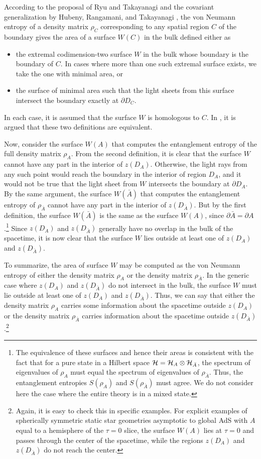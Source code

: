 \documentclass[12pt]{article}
\renewcommand{\(}{\left(}
\renewcommand{\)}{\right)}
\begin{document}
According to the proposal of Ryu and Takayanagi \cite{Ryu:2006bv} and the covariant generalization by Hubeny, Rangamani, and Takayanagi \cite{Hubeny:2007xt}, the von Neumann entropy of a density matrix $\rho_C$ corresponding to any spatial region $C$ of the boundary gives the area of a surface $W(C)$ in the bulk defined either as
\begin{itemize}
\item
the extremal codimension-two surface $W$ in the bulk whose boundary is the boundary of $C$. In cases where more than one such extremal surface exists, we take the one with minimal area, or
\item
the surface of minimal area such that the light sheets from this surface intersect the boundary exactly at $\partial D_C.$
\end{itemize}
In each case, it is assumed that the surface $W$ is homologous to $C$. In \cite{Hubeny:2007xt}, it is argued that these two definitions are equivalent.

Now, consider the surface $W(A)$ that computes the entanglement entropy of the full density matrix $\rho_A$. From the second definition, it is clear that the surface $W$ cannot have any part in the interior of $z(D_A)$. Otherwise, the light rays from any such point would reach the boundary in the interior of region $D_A$, and it would not be true that the light sheet from $W$ intersects the boundary at $\partial D_A$. By the same argument, the surface $W(\bar{A})$ that computes the entanglement entropy of $\rho_{\bar{A}}$ cannot have any part in the interior of $z(D_{\bar{A}})$. But by the first definition, the surface $W(\bar{A})$ is the same as the surface $W(A)$, since $\partial \bar{A} = \partial A$.\footnote{The equivalence of these surfaces and hence their areas is consistent with the fact that for a pure state in a Hilbert space ${\cal H} = {\cal H}_A \otimes {\cal H}_{\bar{A}}$, the spectrum of eigenvalues of $\rho_A$ must equal the spectrum of eigenvalues of $\rho_{\bar{A}}$. Thus, the entanglement entropies $S(\rho_A)$ and $S(\rho_{\bar{A}})$ must agree. We do not consider here the case where the entire theory is in a mixed state.} Since $z(D_A)$ and $z(D_{\bar{A}})$ generally have no overlap in the bulk of the spacetime, it is now clear that the surface $W$ lies outside at least one of $z(D_A)$ and $z(D_{\bar{A}})$.

To summarize, the area of surface $W$ may be computed as the von Neumann entropy of either the density matrix $\rho_A$ or the density matrix $\rho_{\bar{A}}$. In the generic case where $z(D_A)$ and $z(D_{\bar{A}})$ do not intersect in the bulk, the surface $W$ must lie outside at least one of $z(D_A)$ and $z(D_{\bar{A}})$. Thus, we can say that either the density matrix $\rho_A$ carries some information about the spacetime outside $z(D_A)$ or the density matrix $\rho_{\bar{A}}$ carries information about the spacetime outside $z(D_{\bar A})$.\footnote{Again, it is easy to check this in specific examples. For explicit examples of spherically symmetric static star geometries asymptotic to global AdS with $A$ equal to a hemisphere of the $\tau=0$ slice, the surface $W(A)$ lies at $\tau=0$ and passes through the center of the spacetime, while the regions $z(D_A)$ and $z(D_{\bar{A}})$ do not reach the center.}
\end{document}
